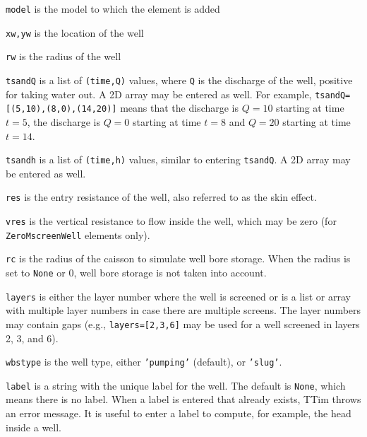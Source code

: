 \documentclass [10pt,letterpaper] {article}
\begin{document}
\begin{description}
    \item {\tt model} is the model to which the element is
    added
    \item {\tt xw,yw} is the location of the well
    \item {\tt rw} is the radius of the well
    \item {\tt tsandQ} is a list of {\tt (time,Q)} values, where {\tt Q} is the discharge of the well, positive for taking water out. A 2D array may be entered as well. For example, {\tt tsandQ=[(5,10),(8,0),(14,20)]} means that the discharge is $Q=10$ starting at time $t=5$, the discharge is $Q=0$ starting at time $t=8$ and $Q=20$ starting at time $t=14$.
    \item {\tt tsandh} is a list of {\tt (time,h)} values, similar to entering {\tt tsandQ}. A 2D array may be entered as well.
    \item {\tt res} is the entry resistance of the well, also referred to as the skin effect.
    \item {\tt vres} is the vertical resistance to flow inside the well, which may be zero (for {\tt ZeroMscreenWell} elements only).
    \item {\tt rc} is the radius of the caisson to simulate well bore storage. When the radius is set to {\tt None} or 0, well bore storage is not taken into account.      
    \item {\tt layers} is either the layer number where the well is screened or is a list or array with
    multiple layer numbers in case there are multiple screens. The layer numbers may contain gaps (e.g., {\tt layers=[2,3,6]} may be used for a well screened in layers 2, 3, and 6).
    \item {\tt wbstype} is the well type, either {\tt 'pumping'} (default), or {\tt 'slug'}.
    \item {\tt label} is a string with the unique label for the well. The default is {\tt None}, which means there is no label. When a label is entered that already exists, TTim throws an error message. It is useful to enter a label to compute, for example, the head inside a well.
\end{description}
\end{document}
